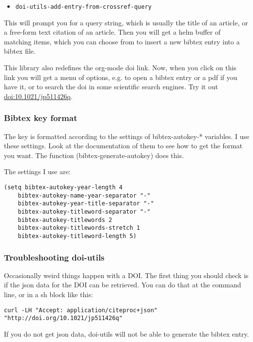 \documentclass[11pt]{article}
\begin{document}
\begin{itemize}
\item \texttt{doi-utils-add-entry-from-crossref-query}
\end{itemize}
This will prompt you for a query string, which is usually the title of an article, or a free-form text citation of an article. Then you will get a helm buffer of matching items, which you can choose from to insert a new bibtex entry into a bibtex file.

This library also redefines the org-mode doi link. Now, when you click on this link you will get a menu of options, e.g. to open a bibtex entry or a pdf if you have it, or to search the doi in some scientific search engines. Try it out  \href{https://doi.org/10.1021/jp511426q}{doi:10.1021/jp511426q}.

\subsubsection{Bibtex key format}
\label{sec:org3f2abca}

The key is formatted according to the settings of bibtex-autokey-* variables. I use these settings. Look at the documentation of them to see how to get the format you want. The function (bibtex-generate-autokey) does this.

The settings I use are:

\begin{verbatim}
(setq bibtex-autokey-year-length 4
	bibtex-autokey-name-year-separator "-"
	bibtex-autokey-year-title-separator "-"
	bibtex-autokey-titleword-separator "-"
	bibtex-autokey-titlewords 2
	bibtex-autokey-titlewords-stretch 1
	bibtex-autokey-titleword-length 5)
\end{verbatim}

\subsubsection{Troubleshooting doi-utils}
\label{sec:org32da5a0}

Occasionally weird things happen with a DOI. The first thing you should check is if the json data for the DOI can be retrieved. You can do that at the command line, or in a sh block like this:

\begin{verbatim}
curl -LH "Accept: application/citeproc+json" "http://doi.org/10.1021/jp511426q"
\end{verbatim}

If you do not get json data, doi-utils will not be able to generate the bibtex entry.
\end{document}
